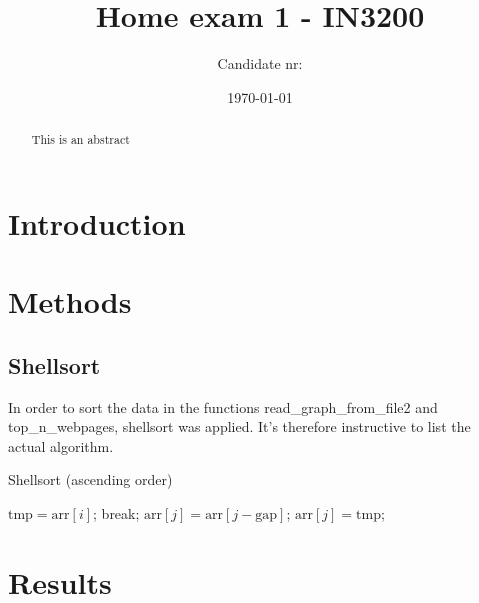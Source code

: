 \documentclass[english,notitlepage,reprint]{revtex4-1}  %
\begin{document}
\title{Home exam 1 - IN3200}      %
\author{Candidate nr:}          %
\date{\today}                             %
\noaffiliation                            %
                               
\begin{abstract}
This is an abstract

\end{abstract}
\maketitle 
\section{Introduction}
\section{Methods}
\subsection*{Shellsort}
In order to sort the data in the functions read\_graph\_from\_file2 and 
top\_n\_webpages, shellsort was applied. It's therefore instructive to list the actual algorithm. 
\begin{algorithm}[h!]
	\caption{Shellsort (ascending order)}
	\label{algo:metro}
	\begin{algorithmic}
		\State $\text{tmp} = \text{arr}[i]$;
		\State break;
		\EndIf
		\State $\text{arr}[j] = \text{arr}[j-\text{gap}]$;
		\EndFor
		\State $\text{arr}[j] = \text{tmp}$;
	\end{algorithmic}
\end{algorithm}
\section{Results}
\end{document}
